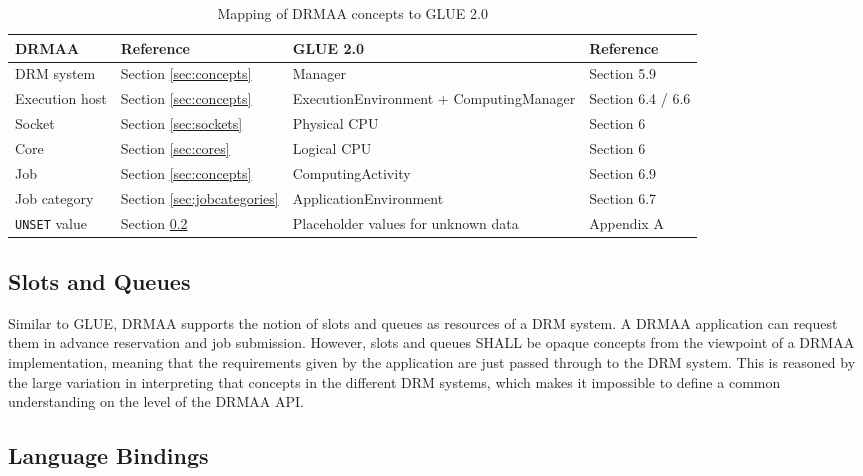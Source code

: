 \documentclass{article}
\newcommand{\h}[1]{\lstinline|#1|}
\newcommand{\rat}[1]{}
\begin{document}
\begin{table}[ht]
\centering
\begin{tabularx}{\textwidth}{|X|X|l|X|}
\hline
DRMAA & Reference & GLUE 2.0  & Reference \cite{gfd.147} \\
\hline
DRM system & Section \ref{sec:concepts} & Manager & Section 5.9 \\
Execution host & Section \ref{sec:concepts} & ExecutionEnvironment + ComputingManager & Section 6.4 / 6.6 \\
Socket & Section \ref{sec:sockets} & Physical CPU & Section 6 \\
Core & Section \ref{sec:cores} & Logical CPU & Section 6 \\
Job & Section \ref{sec:concepts} & ComputingActivity & Section 6.9 \\
Job category & Section \ref{sec:jobcategories} & ApplicationEnvironment & Section 6.7 \\
\h{UNSET} value	& Section \ref{sec:langbind} & Placeholder values for unknown data & Appendix A \\
\hline
\end{tabularx}
\caption{Mapping of DRMAA concepts to GLUE 2.0}
\label{tab:gluemapping}
\end{table}

\subsection{Slots and Queues}
\label{sec:slotsandqueues}

Similar to GLUE, DRMAA supports the notion of slots and queues as resources of a DRM system. A DRMAA application can request them in advance reservation and job submission. However, slots and queues SHALL be opaque concepts from the viewpoint of a DRMAA implementation, meaning that the requirements given by the application are just passed through to the DRM system. This is reasoned by the large variation in interpreting that concepts in the different DRM systems, which makes it impossible to define a common understanding on the level of the DRMAA API.

\rat{
As one example, queues can be either treated as representation of execution hosts (Sun Grid Engine) or as central waiting line located at the scheduler (LSF).  Slots have a meaning in GLUE, but we intentionally stick with the opaque concept approach.
}

\subsection{Language Bindings}
\label{sec:langbind}
\end{document}

